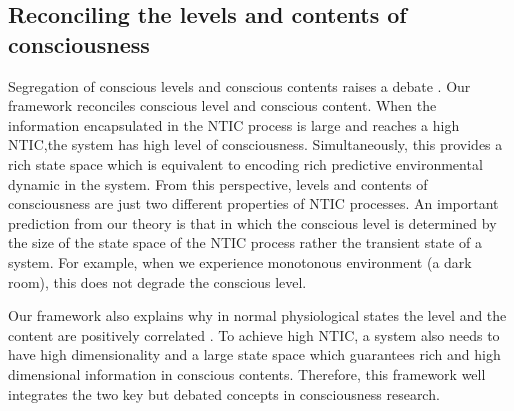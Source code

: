 \documentclass[utf8]{article}
\begin{document}
	    \subsection{Reconciling the levels and contents of consciousness}
	    Segregation of conscious levels and conscious contents raises a debate \citep{bayne2016there, Fazekas2016}. Our framework reconciles conscious level and conscious content. When the information encapsulated in the NTIC process is large and reaches a high NTIC,the system has high level of consciousness. Simultaneously, this provides a rich state space which is equivalent to encoding rich predictive environmental dynamic in the system. From this perspective, levels and contents of consciousness are just two different properties of NTIC processes. An important prediction from our theory is that in which the conscious level is determined by the size of the state space of the NTIC process rather the transient state of a system. For example, when we experience monotonous environment (a dark room), this does not degrade the conscious level.
	    
	    Our framework also explains why in normal physiological states the level and the content are positively correlated \citep{laureys2005neural}\needfig{}. To achieve high NTIC, a system also needs to have high dimensionality and a large state space which guarantees rich and high dimensional information in conscious contents. Therefore, this framework well integrates the two key but debated concepts in consciousness research. 
			
			
			
\end{document}
